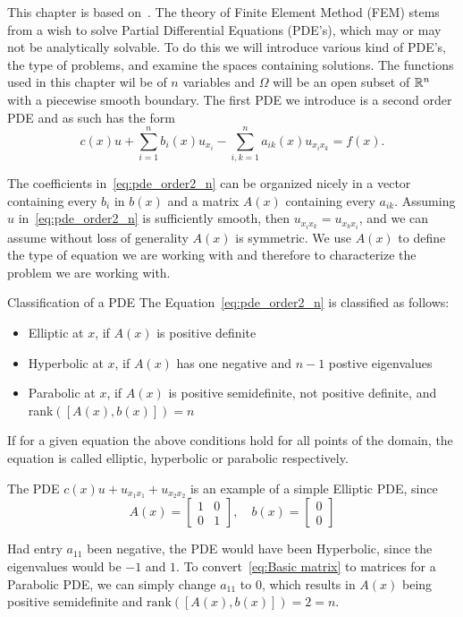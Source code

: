 This chapter is based on~\cite{Braess}.
The theory of Finite Element Method (FEM) stems from a 
wish to solve Partial Differential Equations (PDE's),
which may or may not be analytically solvable. 
To do this we will introduce various kind of PDE's, 
the type of
problems, and examine the spaces containing solutions. 
The functions used in this chapter wil be of $n$ 
variables and $\Omega$ will be 
an open subset of $\mathbb{R}^n$ with a piecewise smooth boundary.
The first PDE we introduce is a second order PDE and as 
such has the form
\begin{equation}
	 c(x) u + \sum_{i=1}^{n}b_i(x)u_{x_{i}}
	- \sum_{i,k=1}^{n}a_{ik}(x)u_{x_i x_k}\label{eq:pde_order2_n}
	= f(x).
\end{equation}

The coefficients in~\eqref{eq:pde_order2_n} can be 
organized nicely in a vector containing every $b_i$ 
in $b(x)$
and a matrix $A(x)$ containing every $a_{ik}$.
Assuming $u$ in~\eqref{eq:pde_order2_n} is sufficiently 
smooth, then $u_{x_i x_k} =u_{x_k x_i} $, and we can 
assume without loss of generality $A(x)$ is 
symmetric. %
We use $A(x)$ to define the type of equation we are working 
with and therefore to characterize the problem we are 
working with.
\begin{defn}{Classification of a PDE}
	The Equation~\eqref{eq:pde_order2_n} is classified as follows:
	\begin{itemize}
		\item Elliptic at $x$, if $A(x)$ is positive definite
		\item Hyperbolic at $x$, if $A(x)$ has one negative and $n-1$ postive eigenvalues
		\item Parabolic at $x$, if $A(x)$ is positive semidefinite, not positive definite, and rank$([A(x), b(x)])=n$
	\end{itemize}
	If for a given equation the above conditions hold for all points of the domain, the equation is called elliptic, hyperbolic or parabolic respectively.\label{def:pde_classification}
\end{defn}


\begin{exmp}{\quad}
The PDE $c(x)u + u_{x_1x_1} + u_{x_2x_2}$ is an example of a simple Elliptic PDE, since
\begin{equation}\label{eq:Basic matrix}
	A(x) = \begin{bmatrix}
		1 & 0\\
		0 & 1
	\end{bmatrix}, \quad
	b(x) = \begin{bmatrix}
		0\\
		0
	\end{bmatrix}
\end{equation}

Had entry $a_{11}$ been negative, the PDE would have been Hyperbolic, since the eigenvalues would be $-1$ and $1$. To convert~\eqref{eq:Basic matrix} to matrices for a Parabolic PDE, we can simply change $a_{11}$ to $0$, which results in $A(x)$ being positive semidefinite and $\text{rank}([A(x), b(x)]) = 2 = n$.
\end{exmp}
	

